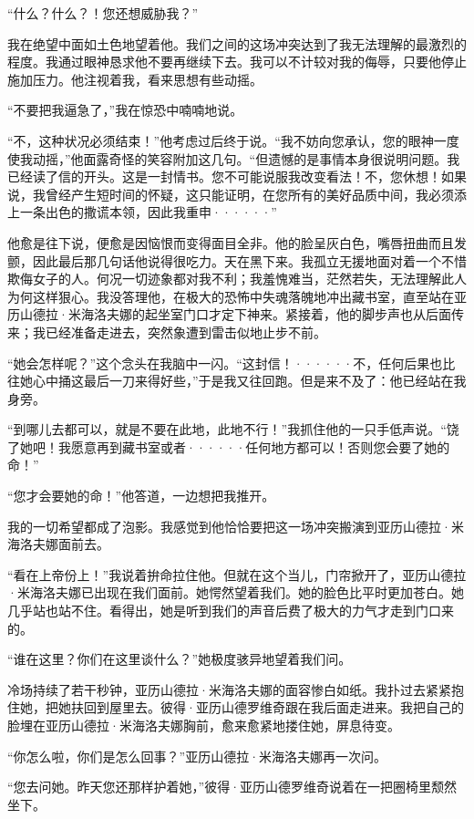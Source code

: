 \documentclass[12pt, UTF8]{ctexbook}
\begin{document}
\par “什么？什么？！您还想威胁我？”
\par 我在绝望中面如土色地望着他。我们之间的这场冲突达到了我无法理解的最激烈的程度。我通过眼神恳求他不要再继续下去。我可以不计较对我的侮辱，只要他停止施加压力。他注视着我，看来思想有些动摇。
\par “不要把我逼急了，”我在惊恐中喃喃地说。
\par “不，这种状况必须结束！”他考虑过后终于说。“我不妨向您承认，您的眼神一度使我动摇，”他面露奇怪的笑容附加这几句。“但遗憾的是事情本身很说明问题。我已经读了信的开头。这是一封情书。您不可能说服我改变看法！不，您休想！如果说，我曾经产生短时间的怀疑，这只能证明，在您所有的美好品质中间，我必须添上一条出色的撒谎本领，因此我重申······”
\par 他愈是往下说，便愈是因恼恨而变得面目全非。他的脸呈灰白色，嘴唇扭曲而且发颤，因此最后那几句话他说得很吃力。天在黑下来。我孤立无援地面对着一个不惜欺侮女子的人。何况一切迹象都对我不利；我羞愧难当，茫然若失，无法理解此人为何这样狠心。我没答理他，在极大的恐怖中失魂落魄地冲出藏书室，直至站在亚历山德拉·米海洛夫娜的起坐室门口才定下神来。紧接着，他的脚步声也从后面传来；我已经准备走进去，突然象遭到雷击似地止步不前。
\par “她会怎样呢？”这个念头在我脑中一闪。“这封信！······不，任何后果也比往她心中捅这最后一刀来得好些，”于是我又往回跑。但是来不及了：他已经站在我身旁。
\par “到哪儿去都可以，就是不要在此地，此地不行！”我抓住他的一只手低声说。“饶了她吧！我愿意再到藏书室或者······任何地方都可以！否则您会要了她的命！”
\par “您才会要她的命！”他答道，一边想把我推开。
\par 我的一切希望都成了泡影。我感觉到他恰恰要把这一场冲突搬演到亚历山德拉·米海洛夫娜面前去。
\par “看在上帝份上！”我说着拚命拉住他。但就在这个当儿，门帘掀开了，亚历山德拉·米海洛夫娜已出现在我们面前。她愕然望着我们。她的脸色比平时更加苍白。她几乎站也站不住。看得出，她是听到我们的声音后费了极大的力气才走到门口来的。
\par “谁在这里？你们在这里谈什么？”她极度骇异地望着我们问。
\par 冷场持续了若干秒钟，亚历山德拉·米海洛夫娜的面容惨白如纸。我扑过去紧紧抱住她，把她扶回到屋里去。彼得·亚历山德罗维奇跟在我后面走进来。我把自己的脸埋在亚历山德拉·米海洛夫娜胸前，愈来愈紧地搂住她，屏息待变。
\par “你怎么啦，你们是怎么回事？”亚历山德拉·米海洛夫娜再一次问。
\par “您去问她。昨天您还那样护着她，”彼得·亚历山德罗维奇说着在一把圈椅里颓然坐下。
\end{document}
